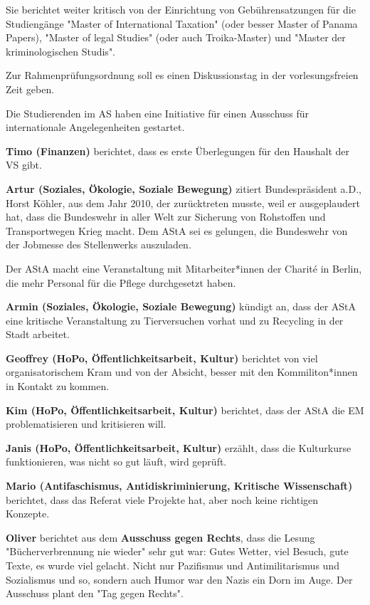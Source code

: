 \documentclass[ngerman,headheight=70pt]{scrartcl}
\begin{document}
    Sie berichtet weiter kritisch von der Einrichtung von Gebührensatzungen für
    die Studiengänge "Master of International Taxation" (oder besser Master of
    Panama Papers), "Master of legal Studies" (oder auch Troika-Master) und
    "Master der kriminologischen Studis".

    Zur Rahmenprüfungsordnung soll es einen Diskussionstag in der vorlesungsfreien
    Zeit geben.

    Die Studierenden im AS haben eine Initiative für einen Ausschuss für
    internationale Angelegenheiten gestartet.

    \textbf{Timo (Finanzen)} berichtet, dass es erste Überlegungen für den
    Haushalt der VS gibt.

    \textbf{Artur (Soziales, Ökologie, Soziale Bewegung)} zitiert
    Bundespräsident a.D., Horst Köhler, aus dem Jahr 2010, der zurücktreten
    musste, weil er ausgeplaudert hat, dass die Bundeswehr in aller Welt zur
    Sicherung von Rohstoffen und Transportwegen Krieg macht. Dem AStA sei es
    gelungen, die Bundeswehr von der Jobmesse des Stellenwerks auszuladen.

    Der AStA macht eine Veranstaltung mit Mitarbeiter*innen der Charité in
    Berlin, die mehr Personal für die Pflege durchgesetzt haben.

    \textbf{Armin (Soziales, Ökologie, Soziale Bewegung)} kündigt an, dass der
    AStA eine kritische Veranstaltung zu Tierversuchen vorhat und zu Recycling
    in der Stadt arbeitet.

    \textbf{Geoffrey (HoPo, Öffentlichkeitsarbeit, Kultur)} berichtet von viel
    organisatorischem Kram und von der Absicht, besser mit den Kommiliton*innen
    in Kontakt zu kommen.

    \textbf{Kim (HoPo, Öffentlichkeitsarbeit, Kultur)} berichtet, dass der AStA
    die EM problematisieren und kritisieren will.

    \textbf{Janis (HoPo, Öffentlichkeitsarbeit, Kultur)} erzählt, dass die
    Kulturkurse funktionieren, was nicht so gut läuft, wird geprüft.

    \textbf{Mario (Antifaschismus, Antidiskriminierung, Kritische Wissenschaft)}
    berichtet, dass das Referat viele Projekte hat, aber noch keine richtigen
    Konzepte.

    \textbf{Oliver} berichtet aus dem \textbf{Ausschuss gegen Rechts}, dass die
    Lesung "Bücherverbrennung nie wieder" sehr gut war: Gutes Wetter, viel Besuch,
    gute Texte, es wurde viel gelacht. Nicht nur Pazifismus und Antimilitarismus
    und Sozialismus und so, sondern auch Humor war den Nazis ein Dorn im Auge.
    Der Ausschuss plant den "Tag gegen Rechts".
\end{document}
